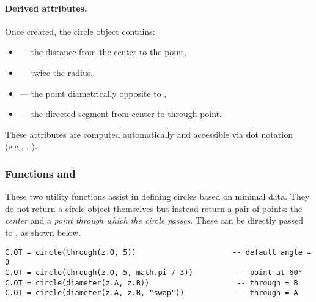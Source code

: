 \paragraph{Derived attributes.}
Once created, the circle object contains:
\begin{itemize}
\item {} — the distance from the center to the point,
\item {} — twice the radius,
\item {} — the point diametrically opposite to ,
\item {} — the directed segment from center to through point.
\end{itemize}
These attributes are computed automatically and accessible via dot notation (e.g., , ).


\vspace{1em}

\begin{tkzexample}[latex=.5\textwidth]
\begin{center}
  \end{center}
\end{tkzexample}


\subsubsection{Functions  and }
\label{ssub:function_code_through_and_code_diameter}

These two utility functions assist in defining circles based on minimal data. They do not return a circle object themselves but instead return a pair of points: the \emph{center} and a \emph{point through which the circle passes}. These can be directly passed to , as shown below.

\begin{mybox}
\begin{verbatim}
C.OT = circle(through(z.O, 5))                      -- default angle = 0
C.OT = circle(through(z.O, 5, math.pi / 3))          -- point at 60°
C.OT = circle(diameter(z.A, z.B))                    -- through = B
C.OT = circle(diameter(z.A, z.B, "swap"))            -- through = A
\end{verbatim}
\end{mybox}

